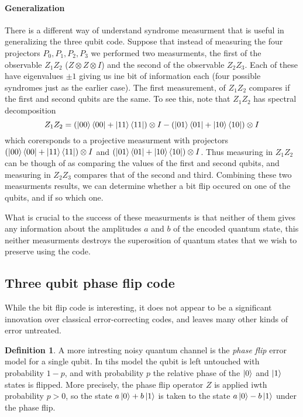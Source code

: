 \documentclass[11pt,a4paper]{article}
\theoremstyle{definition}
\newtheorem{definition}{Definition}[section]
\theoremstyle{plain}
\theoremstyle{remark}
\begin{document}
\paragraph{Generalization} 
There is a different way of understand syndrome measurment that is useful in generalizing the three qubit code. Suppose that 
instead of measuring the four projectors $P_0, P_1, P_2, P_3$ we performed two measurments, the first of the observable $Z_1 Z_2$ ($Z \otimes Z \otimes I$) and the second of the observable $Z_2 Z_3$. 
Each of these have eigenvalues $\pm 1$ giving us ine bit of information each (four possible syndromes just as the earlier case). The first measurement, of $Z_1 Z_2$ compares if the first and second qubits are the same. 
To see this, note that $Z_1 Z_2$ has spectral decomposition 
$$Z_1 Z_2 = \left(\ket{00} \bra{00} + \ket{11} \bra{11}\right) \otimes I - \left(\ket{01} \bra{01} + \ket{10} \bra{10}\right) \otimes I$$
which corersponds to a projective measurment with projectors $\left(\ket{00} \bra{00} + \ket{11} \bra{11}\right) \otimes I$ and $\left(\ket{01} \bra{01} + \ket{10} \bra{10}\right) \otimes I$. 
Thus measuring in $Z_1 Z_2$ can be though of as comparing the values of the first and second qubits, and measuring in $Z_2 Z_3$ compares that of the second and third. Combining these two measurments results, we can determine whether a bit flip 
occured on one of the qubits, and if so which one. 

What is crucial to the success of these measurments is that neither of them gives any information about the amplitudes $a$ and $b$ of the encoded quantum state, this neither measurments destroys the superosition of quantum states that we wish to preserve using the code. 

\subsection{Three qubit phase flip code}
While the bit flip code is interesting, it does not appear to be a significant innovation over classical error-correcting codes, and leaves many other kinds of error untreated. 

\begin{definition}
A more intresting noisy quantum channel is the \emph{phase flip} error model for a single qubit. In tihs model the 
qubit is left untouched with probability $1-p$, and with probability $p$ the relative phase of the $\ket{0}$ and $\ket{1}$ states is flipped. 
More precisely, the phase flip operator $Z$ is applied iwth probability $p > 0$, so the state $a \ket{0} + b \ket{1}$ is taken to the state 
$a \ket{0} - b \ket{1}$ under the phase flip.
\end{definition}
\end{document}
